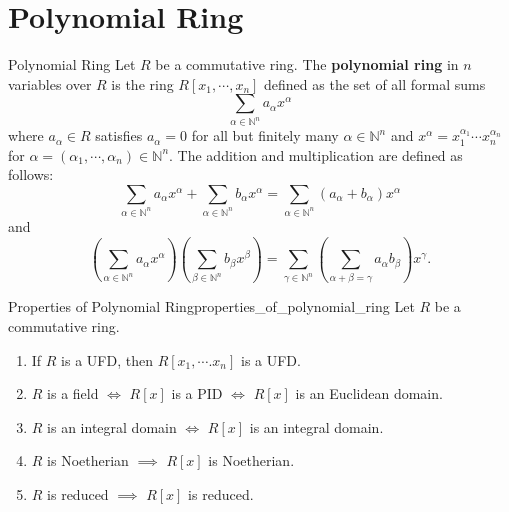 \section{Polynomial Ring}
\begin{definition}{Polynomial Ring}{}
    Let $R$ be a commutative ring. The \textbf{polynomial ring} in $n$ variables over $R$ is the ring $R[x_1,\cdots,x_n]$ defined as the set of all formal sums $$\sum_{\alpha\in\mathbb{N}^n}a_\alpha x^\alpha$$ where $a_\alpha\in R$ satisfies $a_\alpha=0$ for all but finitely many $\alpha\in\mathbb{N}^n$ and $x^\alpha=x_1^{\alpha_1}\cdots x_n^{\alpha_n}$ for $\alpha=(\alpha_1,\cdots,\alpha_n)\in\mathbb{N}^n$. The addition and multiplication are defined as follows: $$\sum_{\alpha\in\mathbb{N}^n}a_\alpha x^\alpha+\sum_{\alpha\in\mathbb{N}^n}b_\alpha x^\alpha=\sum_{\alpha\in\mathbb{N}^n}(a_\alpha+b_\alpha)x^\alpha$$ and $$\left(\sum_{\alpha\in\mathbb{N}^n}a_\alpha x^\alpha\right)\left(\sum_{\beta\in\mathbb{N}^n}b_\beta x^\beta\right)=\sum_{\gamma\in\mathbb{N}^n}\left(\sum_{\alpha+\beta=\gamma}a_\alpha b_\beta\right)x^\gamma.$$
\end{definition}


\begin{proposition}{Properties of Polynomial Ring}{properties_of_polynomial_ring}
    Let $R$ be a commutative ring.
    \begin{enumerate}
        \item If $R$ is a UFD, then $R[x_1,\cdots.x_n]$ is a UFD.
        \item $R$ is a field $\iff$ $R[x]$ is a PID $\iff$ $R[x]$ is an Euclidean domain.
        \item $R$ is an integral domain $\iff$ $R[x]$ is an integral domain.
        \item $R$ is Noetherian $\implies$ $R[x]$ is Noetherian.
        \item $R$ is reduced $\implies$ $R[x]$ is reduced.
    \end{enumerate}
\end{proposition}




